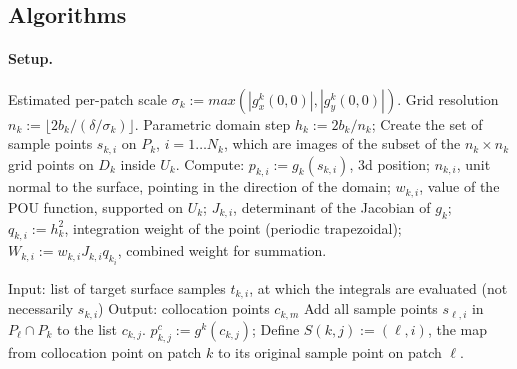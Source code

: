 \documentclass[10pt]{article}
\begin{document}
\subsection*{Algorithms} 

\paragraph{Setup.}


\begin{algorithmic}
\STATE{}
\STATE{}
\STATE Estimated per-patch scale $\sigma_k :=  max(|g^k_x(0,0)|, |g^k_y(0,0)|)$.
\STATE Grid resolution $n_k := \lfloor 2 b_k/(\delta/\sigma_k) \rfloor$.
\STATE Parametric  domain step $h_k := 2b_k/n_k$;
\STATE Create the set of sample points $s_{k,i}$ on $P_k$, $i=1\ldots N_k$,  which are images of the subset of the  $n_k \times n_k$ grid points on $D_k$ inside $U_k$.   
\STATE{}
\STATE Compute: 
\STATE $p_{k,i} := g_k(s_{k,i})$, 3d position;
\STATE $n_{k,i}$, unit normal to the surface, pointing in the direction of the domain;
\STATE $w_{k,i}$, value of the  POU function, supported on  $U_k$; 
\STATE $J_{k,i}$, determinant of the Jacobian of $g_k$;
\STATE $q_{k,i} := h_k^2$, integration weight of the point (periodic trapezoidal);
\STATE $W_{k,i} := w_{k,i}J_{k,i}q_{k_i}$, combined weight for summation.		   
\ENDFOR
\ENDFOR
\end{algorithmic}

\begin{algorithmic}
\STATE{}
\STATE {}
\STATE Input: list of target surface samples $t_{k,i}$, at which the integrals are evaluated (not necessarily $s_{k,i}$)
\STATE Output: collocation points $c_{k,m}$
\STATE Add all sample points $s_{\ell,i}$ in  $P_\ell \cap P_k$ to the list $c_{k,j}$.
\STATE $p^c_{k,j} := g^k(c_{k,j})$;
\STATE Define $S(k,j) := (\ell,i)$, the map from collocation point on
patch $k$ to its original sample point on patch $\ell$.
\ENDFOR
\ENDFOR
\end{algorithmic} 
\newpage
\end{document}
